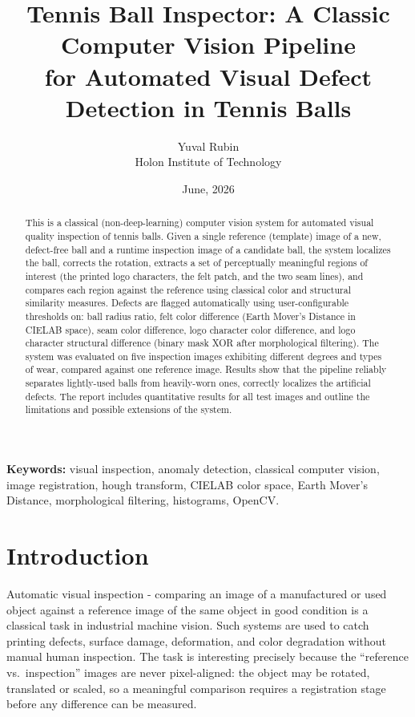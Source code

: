 \documentclass[11pt,a4paper]{article}
\title{\textbf{Tennis Ball Inspector: A Classic Computer Vision Pipeline \\
for Automated Visual Defect Detection in Tennis Balls}}
\author{Yuval Rubin \\
\small Holon Institute of Technology}
\date{June, 2026}
\begin{document}
\maketitle

\begin{abstract}
\noindent
This is a classical (non-deep-learning) computer vision system for automated
visual quality inspection of tennis balls. Given a single reference (template)
image of a new, defect-free ball and a runtime inspection image of a candidate
ball, the system localizes the ball, corrects the rotation, extracts
a set of perceptually meaningful regions of interest (the printed logo
characters, the felt patch, and the two seam lines), and compares each region
against the reference using classical color and structural similarity
measures. Defects are flagged automatically using user-configurable
thresholds on: ball radius ratio, felt color difference (Earth Mover's
Distance in CIELAB space), seam color difference, logo character color
difference, and logo character structural difference (binary mask XOR after
morphological filtering). The system was evaluated on five inspection images
exhibiting different degrees and types of wear,
compared against one reference image. Results show that the pipeline
reliably separates lightly-used balls from heavily-worn ones, correctly
localizes the artificial defects. The report includes quantitative results for all test images and outline the
limitations and possible extensions of the system.
\end{abstract}

\vspace{0.3cm}
\noindent\textbf{Keywords:} visual inspection, anomaly detection, classical
computer vision, image registration, hough transform, CIELAB color space,
Earth Mover's Distance, morphological filtering, histograms, OpenCV.

\tableofcontents
\newpage

\section{Introduction}
Automatic visual inspection - comparing an image of a manufactured or
used object against a reference image of the same object in good condition is a classical task in industrial machine vision. Such systems are used to
catch printing defects, surface damage, deformation, and color degradation
without manual human inspection. The task is interesting precisely because
the ``reference vs.\ inspection'' images are never pixel-aligned: the object
may be rotated, translated or scaled, so a meaningful comparison requires a registration stage before any difference can be measured.
\end{document}
